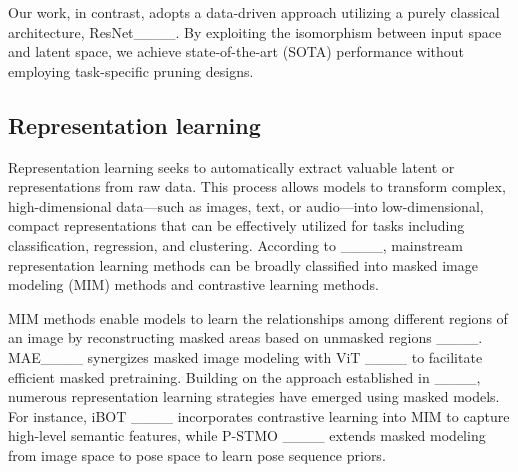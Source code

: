 Our work, in contrast, adopts a data-driven approach utilizing a purely classical architecture, ResNet____. By exploiting the isomorphism between input space and latent space, we achieve state-of-the-art (SOTA) performance without employing task-specific pruning designs.

\subsection{Representation learning}

Representation learning seeks to automatically extract valuable latent or representations from raw data. This process allows models to transform complex, high-dimensional data---such as images, text, or audio---into low-dimensional, compact representations that can be effectively utilized for tasks including classification, regression, and clustering. According to ____, mainstream representation learning methods can be broadly classified into masked image modeling (MIM) methods and contrastive learning methods.

MIM methods enable models to learn the relationships among different regions of an image by reconstructing masked areas based on unmasked regions ____. MAE____ synergizes masked image modeling with ViT ____ to facilitate efficient masked pretraining. Building on the approach established in ____, numerous representation learning strategies have emerged using masked models. For instance, iBOT ____ incorporates contrastive learning into MIM to capture high-level semantic features, while P-STMO ____ extends masked modeling from image space to pose space to learn pose sequence priors.

